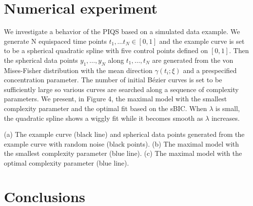 \documentclass[a0,portrait]{a0poster}
\begin{document}
\begin{multicols}{2}
\section*{Numerical experiment}

We investigate a behavior of the PIQS based on a simulated data example.
We generate N equispaced time points $t_1, \ldots t_N \in [0, 1]$ and the example curve is set to be a spherical quadratic spline with five control points defined on $[0, 1]$.
Then the spherical data points $y_1, \ldots, y_N$ along $t_1, \ldots, t_N$ are generated from the
von Mises-Fisher distribution with the mean direction $\gamma(t_i; \xi)$ and a prespecified concentration parameter.
The number of initial B\'ezier curves is set to be sufficiently large so various curves are searched along a sequence of complexity parameters.
We present, in Figure 4,
the maximal model with the smallest complexity parameter and the optimal fit based on the sBIC.
When $\lambda$ is small,
the quadratic spline shows a wiggly fit while it becomes smooth as $\lambda$ increases.

\vspace{2cm}

\begin{minipage}{\columnwidth}
\makeatletter
\newcommand{\@captype}{figure}
\makeatother
\centering
{} \qquad%
 \qquad%
\caption{(a) The example curve (black line) and spherical data points generated from the example curve with random noise (black points). (b) The maximal model with the smallest complexity parameter (blue line). (c) The maximal model with the optimal complexity parameter (blue line).}
\end{minipage}




\section*{Conclusions}


\end{multicols}
\end{document}
